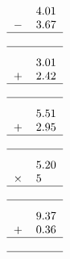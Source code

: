 \documentclass[leqno, 12pt]{article}
\begin{document}
\begin{multicols}{3}
\begin{equation}
\end{equation}
\vspace{-1pt}%
\begin{equation}
    \raisebox{-0.8cm}{
        \begin{tabular}{c S[table-format=1.2]}
         &4.01 \tabularnewline
        $-$&3.67 \tabularnewline
        \hline
         & \tabularnewline
        \hline
    \end{tabular}}
\end{equation}
\vspace{-1pt}%
\begin{equation}
    \raisebox{-0.8cm}{
        \begin{tabular}{c S[table-format=1.2]}
         &3.01 \tabularnewline
        $+$&2.42 \tabularnewline
        \hline
         & \tabularnewline
        \hline
    \end{tabular}}
\end{equation}
\vspace{-1pt}%
\begin{equation}
    \raisebox{-0.8cm}{
        \begin{tabular}{c S[table-format=1.2]}
         &5.51 \tabularnewline
        $+$&2.95 \tabularnewline
        \hline
         & \tabularnewline
        \hline
    \end{tabular}}
\end{equation}
\vspace{-1pt}%
\begin{equation}
    \raisebox{-0.8cm}{
        \begin{tabular}{c S[table-format=1.2]}
         &5.20 \tabularnewline
        $\times$&5 \tabularnewline
        \hline
         & \tabularnewline
        \hline
    \end{tabular}}
\end{equation}
\vspace{-1pt}%
\begin{equation}
    \raisebox{-0.8cm}{
        \begin{tabular}{c S[table-format=1.2]}
         &9.37 \tabularnewline
        $+$&0.36 \tabularnewline
        \hline
         & \tabularnewline
        \hline
    \end{tabular}}
\end{equation}
\vspace{-1pt}%
\begin{equation}
    \raisebox{-0.8cm}{
        \begin{tabular}{c S[table-format=1.2]}

\end{tabular}}
\end{equation}
\end{multicols}
\end{document}
